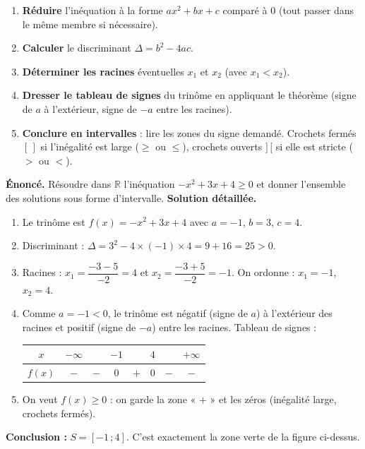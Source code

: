 \documentclass[11pt]{article}
\begin{document}
\begin{methode}
\begin{enumerate}
\item \textbf{Réduire} l'inéquation à la forme $ax^2+bx+c$ comparé à $0$ (tout passer dans le même membre si nécessaire).
\item \textbf{Calculer} le discriminant $\Delta=b^2-4ac$.
\item \textbf{Déterminer les racines} éventuelles $x_1$ et $x_2$ (avec $x_1<x_2$).
\item \textbf{Dresser le tableau de signes} du trinôme en appliquant le théorème (signe de $a$ à l'extérieur, signe de $-a$ entre les racines).
\item \textbf{Conclure en intervalles} : lire les zones du signe demandé. Crochets fermés $[\,]$ si l'inégalité est large ($\geq$ ou $\leq$), crochets ouverts $]\,[$ si elle est stricte ($>$ ou $<$).
\end{enumerate}
\end{methode}

\begin{exoresolu}
\textbf{Énoncé.} Résoudre dans $\mathbb{R}$ l'inéquation $-x^2+3x+4\geq 0$ et donner l'ensemble des solutions sous forme d'intervalle.
\tcblower
\textbf{Solution détaillée.}
\begin{enumerate}
\item Le trinôme est $f(x)=-x^2+3x+4$ avec $a=-1$, $b=3$, $c=4$.
\item Discriminant : $\Delta=3^2-4\times(-1)\times 4=9+16=25>0$.
\item Racines : $x_1=\dfrac{-3-5}{-2}=4$ et $x_2=\dfrac{-3+5}{-2}=-1$. On ordonne : $x_1=-1$, $x_2=4$.
\item Comme $a=-1<0$, le trinôme est négatif (signe de $a$) à l'extérieur des racines et positif (signe de $-a$) entre les racines. Tableau de signes :
\begin{center}
\begin{tabular}{|c|ccccccc|}\hline
$x$ & $-\infty$ & & $-1$ & & $4$ & & $+\infty$ \\ \hline
$f(x)$ & $-$ & $-$ & $0$ & $+$ & $0$ & $-$ & $-$ \\ \hline
\end{tabular}
\end{center}
\item On veut $f(x)\geq 0$ : on garde la zone « $+$ » et les zéros (inégalité large, crochets fermés).
\end{enumerate}
\textbf{Conclusion :} $S=[-1\,;4]$. C'est exactement la zone verte de la figure ci-dessus.
\end{exoresolu}
\end{document}
